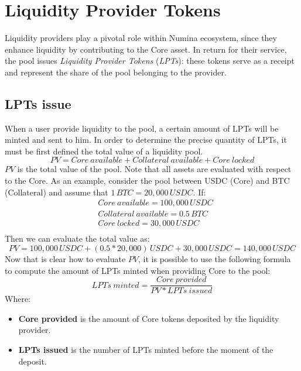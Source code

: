 \documentclass[12pt]{paper}
\begin{document}
\section{Liquidity Provider Tokens}
\label{sec:lptoken}
	Liquidity providers play a pivotal role within Numina ecosystem, since they enhance liquidity by contributing to the Core asset. In return for their service, the pool issues \textit{Liquidity Provider Tokens} (\textit{LPTs}): these tokens serve as a receipt and represent the share of the pool belonging to the provider.
	
	\subsection{LPTs issue}
	\label{subsec:issue}
		When a user provide liquidity to the pool, a certain amount of LPTs will be minted and sent to him. In order to determine the precise quantity of LPTs, it must be first defined the total value of a liquidity pool.
		\begin{equation}
			PV = Core\ available + Collateral\ available + Core\ locked
		\end{equation}
		$PV$ is the total value of the pool. Note that all assets are evaluated with respect to the Core. As an example, consider the pool between USDC (Core) and BTC (Collateral) and assume that $1 \, BTC = 20,000 \, USDC$. If:
		\begin{equation*}
			\begin{split}
				&Core\ available = 100,000 \, USDC\\
				&Collateral\ available = 0.5 \, BTC\\
				&Core\ locked = 30,000 \, USDC\\
			\end{split}
		\end{equation*}
		Then we can evaluate the total value as:
		\begin{equation*}
			PV = 100,000 \, USDC + (0.5*20,000) \, USDC + 30,000 \, USDC = 140,000 \, USDC
		\end{equation*}
		Now that is clear how to evaluate $PV$, it is possible to use the following formula to compute the amount of LPTs minted when providing Core to the pool:
		\begin{equation}
			LPTs\ minted = \frac{Core\ provided}{PV * LPTs\ issued}
		\end{equation}
		Where:
		\begin{itemize}
			\item \textbf{Core provided} is the amount of Core tokens deposited by the liquidity provider.
			\item \textbf{LPTs issued} is the number of LPTs minted before the moment of the deposit.
		\end{itemize}
		
\end{document}
